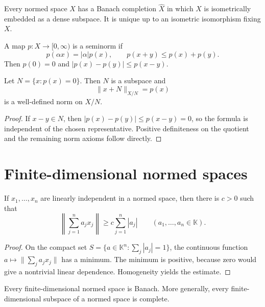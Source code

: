 \begin{notetheorem}
Every normed space $X$ has a Banach completion $\widehat X$ in which $X$ is
isometrically embedded as a dense subspace.  It is unique up to an isometric
isomorphism fixing $X$.
\end{notetheorem}

\begin{notedefinition}[Seminorm]
A map $p\colon X\to[0,\infty)$ is a seminorm if
\[
  p(\alpha x)=|\alpha|p(x),
  \qquad
  p(x+y)\le p(x)+p(y).
\]
Then $p(0)=0$ and $|p(x)-p(y)|\le p(x-y)$.
\end{notedefinition}

\begin{noteproposition}
Let $N=\{x:p(x)=0\}$.  Then $N$ is a subspace and
\[
  \|x+N\|_{X/N}=p(x)
\]
is a well-defined norm on $X/N$.
\end{noteproposition}

\begin{proof}
If $x-y\in N$, then
$|p(x)-p(y)|\le p(x-y)=0$, so the formula is independent of the chosen
representative.  Positive definiteness on the quotient and the remaining norm
axioms follow directly.
\end{proof}

\section{Finite-dimensional normed spaces}

\begin{notelemma}
If $x_1,\ldots,x_n$ are linearly independent in a normed space, then there is
$c>0$ such that
\[
  \left\|\sum_{j=1}^n a_jx_j\right\|
  \ge c\sum_{j=1}^n|a_j|
  \qquad(a_1,\ldots,a_n\in\mathbb K).
\]
\end{notelemma}

\begin{proof}
On the compact set
$S=\{a\in\mathbb K^n:\sum_j|a_j|=1\}$, the continuous function
$a\mapsto\|\sum_ja_jx_j\|$ has a minimum.  The minimum is positive, because
zero would give a nontrivial linear dependence.  Homogeneity yields the
estimate.
\end{proof}

\begin{notetheorem}[Completeness]
Every finite-dimensional normed space is Banach.  More generally, every
finite-dimensional subspace of a normed space is complete.
\end{notetheorem}

